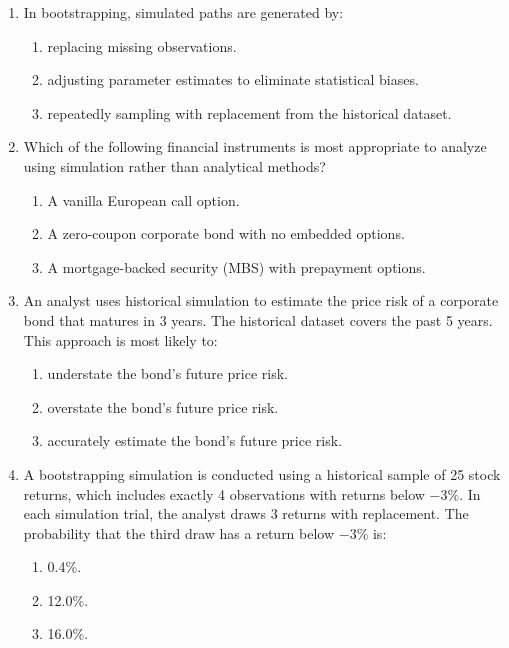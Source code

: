 \begin{enumerate}
	\item In bootstrapping, simulated paths are generated by:
	      \begin{enumerate}[label=\Alph*.]
		      \item replacing missing observations.
		      \item adjusting parameter estimates to eliminate statistical biases.
		      \item repeatedly sampling with replacement from the historical dataset.
	      \end{enumerate}

	\item Which of the following financial instruments is most appropriate to analyze using simulation rather than analytical methods?
	      \begin{enumerate}[label=\Alph*.]
		      \item A vanilla European call option.
		      \item A zero-coupon corporate bond with no embedded options.
		      \item A mortgage-backed security (MBS) with prepayment options.
	      \end{enumerate}

	\item An analyst uses historical simulation to estimate the price risk of a corporate bond that matures in 3 years. The historical dataset covers the past 5 years. This approach is most likely to:
	      \begin{enumerate}[label=\Alph*.]
		      \item understate the bond's future price risk.
		      \item overstate the bond's future price risk.
		      \item accurately estimate the bond's future price risk.
	      \end{enumerate}

	\item A bootstrapping simulation is conducted using a historical sample of 25 stock returns, which includes exactly 4 observations with returns below $-3\%$. In each simulation trial, the analyst draws 3 returns with replacement. The probability that the third draw has a return below $-3\%$ is:
	      \begin{enumerate}[label=\Alph*.]
		      \item 0.4\%.
		      \item 12.0\%.
		      \item 16.0\%.
	      \end{enumerate}


\end{enumerate}
